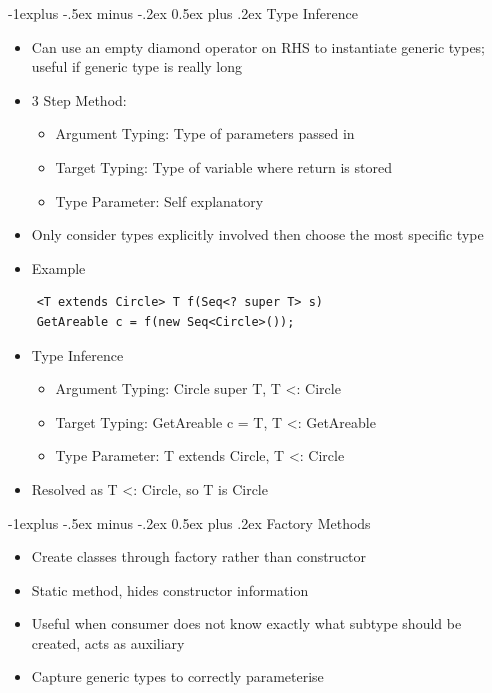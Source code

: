 \documentclass[10pt, landscape]{article}
\makeatletter
\renewcommand{\section}{\@startsection{section}{1}{0mm}%
                                {-1ex plus -.5ex minus -.2ex}%
                                {0.5ex plus .2ex}%
                                {\normalfont\large\bfseries}}
\renewcommand{\section}{\@startsection{section}{2}{0mm}%
                                {-1explus -.5ex minus -.2ex}%
                                {0.5ex plus .2ex}%
                                {\normalfont\normalsize\bfseries}}
\makeatother
\begin{document}
\begin{multicols*}{4}
\section{Type Inference}
\begin{itemize}
    \item Can use an empty diamond operator on RHS to instantiate generic types; useful if generic type is really long
    \item 3 Step Method:
    \begin{itemize}
        \item Argument Typing: Type of parameters passed in
        \item Target Typing: Type of variable where return is stored
        \item Type Parameter: Self explanatory
    \end{itemize}
    \item Only consider types explicitly involved then choose the most specific type
    \item Example
\end{itemize}
\begin{lstlisting}
    <T extends Circle> T f(Seq<? super T> s)
    GetAreable c = f(new Seq<Circle>());
\end{lstlisting}
\begin{itemize}
    \item Type Inference
    \begin{itemize}
        \item Argument Typing: Circle super T, T <: Circle
        \item Target Typing: GetAreable c = T, T <: GetAreable
        \item Type Parameter: T extends Circle, T <: Circle
    \end{itemize}
    \item Resolved as T <: Circle, so T is Circle
\end{itemize}

\section{Factory Methods}
\begin{itemize}
    \item Create classes through factory rather than constructor
    \item Static method, hides constructor information
    \item Useful when consumer does not know exactly what subtype should be created, acts as auxiliary
    \item Capture generic types to correctly parameterise
\end{itemize}


\end{multicols*}
\end{document}

